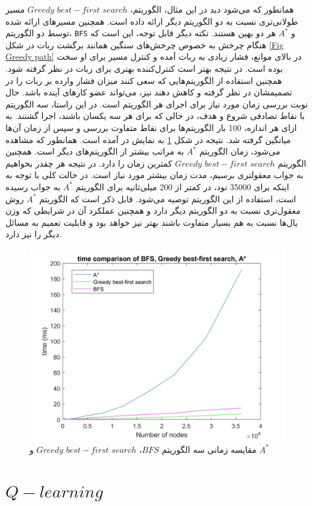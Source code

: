 \newpage
همانطور که می‌شود دید در این مثال، الگوریتم، $search$ $best-first$ $Greedy$ مسیر طولانی‌تری نسبت به دو الگوریتم دیگر ارائه داده است. همچنین مسیرهای ارائه شده توسط دو الگوریتم، \verb|BFS| و $A^*$ هر دو بهین هستند.
\newpage
نکته دیگر قابل توجه، این است که هنگام چرخش به خصوص چرخش‌های سنگین همانند برگشت ربات در شکل \ref{Fig Greedy path} در بالای موانع، فشار زیادی به ربات آمده و کنترل مسیر برای او سخت بوده است. در نتیجه بهتر است کنترل‌کننده بهتری برای ربات در نظر گرفته شود. همچنین استفاده از الگوریتم‌هایی که سعی کنند میزان فشار وارده بر ربات را در تصمیمشان در نظر گرفته و کاهش دهند نیز، می‌تواند عضو کارهای آینده باشد.
\newpage
حال نوبت بررسی زمان مورد نیاز برای اجرای هر الگوریتم است. در این راستا، سه الگوریتم با نقاط تصادفی شروع و هدف، در حالی که برای هر سه یکسان باشند، اجرا گشتند. به ازای هر اندازه، 100 بار الگوریتم‌ها برای نقاط متفاوت بررسی و سپس از زمان آن‌ها میانگین گرفته شد. نتیجه در شکل \ref{Fig heuristic time} به نمایش در آمده است. همانطور که مشاهده می‌شود، زمان الگوریتم $A^*$ به مراتب بیشتر از الگوریتم‌های دیگر است. همچنین الگوریتم $search$ $best-first$ $Greedy$ کمترین زمان را دارد. در نتیجه هر چقدر بخواهیم به جواب معقولتری برسیم، مدت زمان بیشتر مورد نیاز است. در حالت کلی با توجه به اینکه برای 35000 نود، در کمتر از 200 میلی‌ثانیه برای الگوریتم $A^*$ به جواب رسیده است، استفاده از این الگوریتم توصیه می‌شود. قابل ذکر است که الگوریتم $A^*$ روش معقول‌تری نسبت به دو الگوریتم دیگر دارد و همچنین عملکرد آن در شرایطی که وزن‌ یال‌ها نسبت به هم بسیار متفاوت باشند بهتر نیز خواهد بود و قابلیت تعمیم به مسائل دیگر را نیز دارد.

\begin{figure}[!h]
	\centering
	\includegraphics[scale=0.35]{Images/Heuristic time.jpg}
	\caption{مقایسه زمانی سه الگوریتم $BFS$، $search$ $best-first$ $Greedy$ و $A^*$}\label{Fig heuristic time}
\end{figure}


\newpage
\section{$Q-learning$}

















